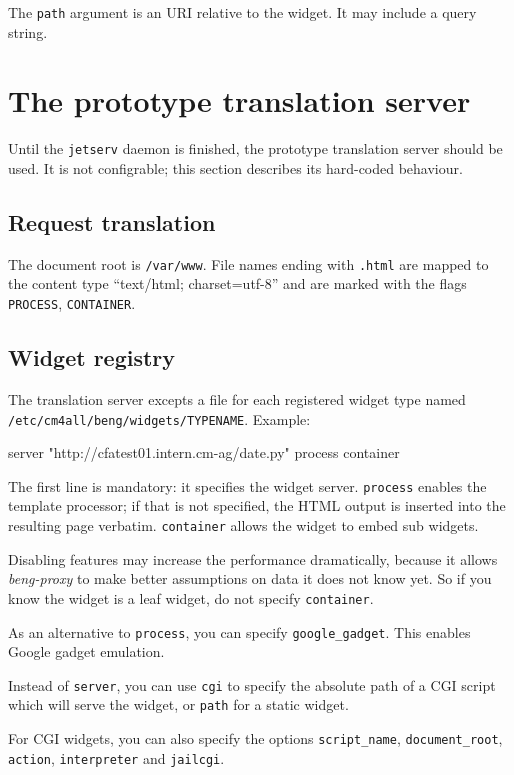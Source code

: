 \documentclass[a4paper,12pt]{article}
\begin{document}
The \texttt{path} argument is an URI relative to the widget.  It may
include a query string.


\section{The prototype translation server}

Until the \texttt{jetserv} daemon is finished, the prototype
translation server should be used.  It is not configrable; this
section describes its hard-coded behaviour.

\subsection{Request translation}

The document root is \texttt{/var/www}.  File names ending with
\texttt{.html} are mapped to the content type ``text/html;
charset=utf-8'' and are marked with the flags \texttt{PROCESS},
\texttt{CONTAINER}.

\subsection{Widget registry}

The translation server excepts a file for each registered widget type
named \texttt{/etc/cm4all/beng/widgets/TYPENAME}.  Example:

\begin{verbatim*}
server "http://cfatest01.intern.cm-ag/date.py"
process
container
\end{verbatim*}

The first line is mandatory: it specifies the widget server.
\texttt{process} enables the template processor; if that is not
specified, the HTML output is inserted into the resulting page
verbatim.  \texttt{container} allows the widget to embed sub widgets.

Disabling features may increase the performance dramatically, because
it allows \emph{beng-proxy} to make better assumptions on data it does
not know yet.  So if you know the widget is a leaf widget, do not
specify \texttt{container}.

As an alternative to \texttt{process}, you can specify
\texttt{google\_gadget}.  This enables Google gadget emulation.

Instead of \texttt{server}, you can use \texttt{cgi} to specify the
absolute path of a CGI script which will serve the widget, or
\texttt{path} for a static widget.

For CGI widgets, you can also specify the options
\texttt{script\_name}, \texttt{document\_root}, \texttt{action},
\texttt{interpreter} and \texttt{jailcgi}.
\end{document}

